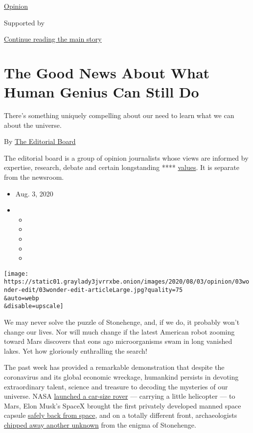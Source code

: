 \href{/section/opinion}{Opinion}

Supported by

\protect\hyperlink{after-sponsor}{Continue reading the main story}

\hypertarget{the-good-news-about-what-human-genius-can-still-do}{%
\section{The Good News About What Human Genius Can Still
Do}\label{the-good-news-about-what-human-genius-can-still-do}}

There's something uniquely compelling about our need to learn what we
can about the universe.

By
\href{https://www.nytimes3xbfgragh.onion/interactive/opinion/editorialboard.html}{The
Editorial Board}

The editorial board is a group of opinion journalists whose views are
informed by expertise, research, debate and certain longstanding ****
\href{https://www.nytimes3xbfgragh.onion/interactive/2018/opinion/editorialboard.html}{values}.
It is separate from the newsroom.

\begin{itemize}
\item
  Aug. 3, 2020
\item
  \begin{itemize}
  \item
  \item
  \item
  \item
  \item
  \end{itemize}
\end{itemize}

\texttt{[image: https://static01.graylady3jvrrxbe.onion/images/2020/08/03/opinion/03wonder-edit/03wonder-edit-articleLarge.jpg?quality=75\\\&auto=webp\\\&disable=upscale]}

We may never solve the puzzle of Stonehenge, and, if we do, it probably
won't change our lives. Nor will much change if the latest American
robot zooming toward Mars discovers that eons ago microorganisms swam in
long vanished lakes. Yet how gloriously enthralling the search!

The past week has provided a remarkable demonstration that despite the
coronavirus and its global economic wreckage, humankind persists in
devoting extraordinary talent, science and treasure to decoding the
mysteries of our universe. NASA
\href{https://www.nytimes3xbfgragh.onion/2020/07/30/science/nasa-mars-launch.html?searchResultPosition=3}{launched
a car-size rover} --- carrying a little helicopter --- to Mars, Elon
Musk's SpaceX brought the first privately developed manned space capsule
\href{https://www.nytimes3xbfgragh.onion/video/us/100000007269118/spacex-splash-down.html?searchResultPosition=2}{safely
back from space}, and on a totally different front, archaeologists
\href{https://www.nytimes3xbfgragh.onion/2020/07/29/science/stonehenge-archaeology-sarsens.html?searchResultPosition=1}{chipped
away another unknown} from the enigma of Stonehenge.

